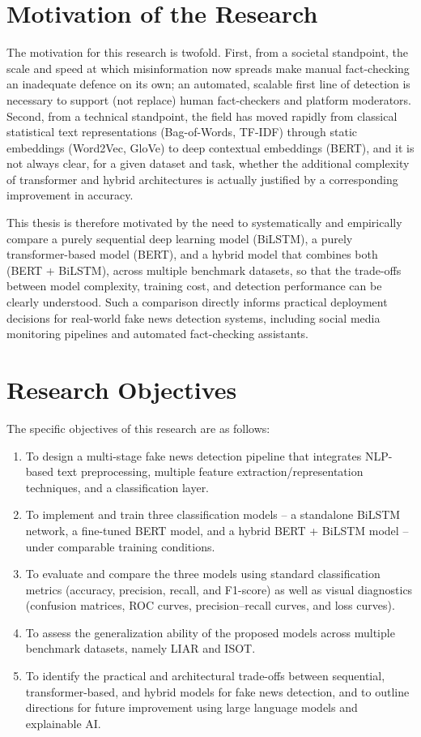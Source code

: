 \section{Motivation of the Research}

The motivation for this research is twofold. First, from a societal standpoint, the scale and speed at which misinformation now spreads make manual fact-checking an inadequate defence on its own; an automated, scalable first line of detection is necessary to support (not replace) human fact-checkers and platform moderators. Second, from a technical standpoint, the field has moved rapidly from classical statistical text representations (Bag-of-Words, TF-IDF) through static embeddings (Word2Vec, GloVe) to deep contextual embeddings (BERT), and it is not always clear, for a given dataset and task, whether the additional complexity of transformer and hybrid architectures is actually justified by a corresponding improvement in accuracy.

This thesis is therefore motivated by the need to systematically and empirically compare a purely sequential deep learning model (BiLSTM), a purely transformer-based model (BERT), and a hybrid model that combines both (BERT + BiLSTM), across multiple benchmark datasets, so that the trade-offs between model complexity, training cost, and detection performance can be clearly understood. Such a comparison directly informs practical deployment decisions for real-world fake news detection systems, including social media monitoring pipelines and automated fact-checking assistants.

\section{Research Objectives}

The specific objectives of this research are as follows:

\begin{enumerate}
\item To design a multi-stage fake news detection pipeline that integrates NLP-based text preprocessing, multiple feature extraction/representation techniques, and a classification layer.
\item To implement and train three classification models -- a standalone BiLSTM network, a fine-tuned BERT model, and a hybrid BERT + BiLSTM model -- under comparable training conditions.
\item To evaluate and compare the three models using standard classification metrics (accuracy, precision, recall, and F1-score) as well as visual diagnostics (confusion matrices, ROC curves, precision--recall curves, and loss curves).
\item To assess the generalization ability of the proposed models across multiple benchmark datasets, namely LIAR and ISOT.
\item To identify the practical and architectural trade-offs between sequential, transformer-based, and hybrid models for fake news detection, and to outline directions for future improvement using large language models and explainable AI.
\end{enumerate}

